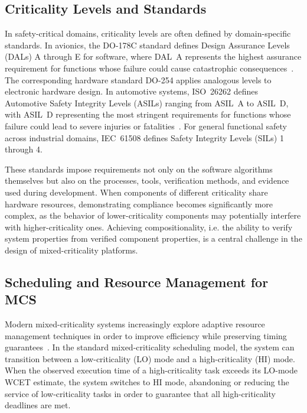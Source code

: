\subsection{Criticality Levels and Standards}
\label{subsec:criticality_standards}

In safety-critical domains, criticality levels are often
defined by domain-specific standards. In avionics, the
DO-178C standard defines Design Assurance Levels (DALs)
A through E for software, where DAL~A represents the
highest assurance requirement for functions whose failure
could cause catastrophic consequences~\cite{do178c2011}. The
corresponding hardware standard DO-254 applies analogous
levels to electronic hardware design. In automotive systems,
ISO~26262 defines Automotive Safety Integrity Levels
(ASILs) ranging from ASIL~A to ASIL~D, with ASIL~D
representing the most stringent requirements for functions
whose failure could lead to severe injuries or
fatalities~\cite{iso26262_2018}. For general functional
safety across industrial domains, IEC~61508 defines Safety
Integrity Levels (SILs) 1 through 4.

These standards impose requirements not only on the software
algorithms themselves but also on the processes, tools,
verification methods, and evidence used during development.
When components of different criticality share hardware
resources, demonstrating compliance becomes significantly
more complex, as the behavior of lower-criticality components
may potentially interfere with higher-criticality ones.
Achieving compositionality, i.e. the ability to verify system
properties from verified component properties, is a central
challenge in the design of mixed-criticality platforms.

\subsection{Scheduling and Resource Management for MCS}
\label{subsec:mcs_scheduling}

Modern mixed-criticality systems increasingly explore adaptive
resource management techniques in order to improve efficiency
while preserving timing guarantees~\cite{burns2017}. %
In the standard mixed-criticality scheduling model, the
system can transition between a low-criticality (LO) mode
and a high-criticality (HI) mode. When the observed execution
time of a high-criticality task exceeds its LO-mode WCET
estimate, the system switches to HI mode, abandoning or
reducing the service of low-criticality tasks in order to
guarantee that all high-criticality deadlines are met.

